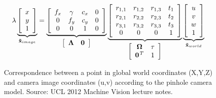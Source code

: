 \documentclass{ucl_thesis}
\begin{document}
\begin{figure}[h!]
\begin{equation}
\lambda
\underbrace{
	\left[\begin{array}{ccc}
	    x \\
	    y \\
	    1 \\
	\end{array} \right]
}_{
	{\bf \tilde{x}}_{image}
}
%
=
%
\underbrace{
	\left[\begin{array}{cccc}
			f_x & \gamma & c_x & 0 \\
			0   & f_y    & c_y & 0 \\
	 		0   & 0      & 1   & 0 \\
	\end{array} \right]
}_{
	\left[\begin{array}{cc}
		\bf{\Lambda} & \bf{0}
	\end{array} \right]
}
%
\underbrace{
	\left[\begin{array}{cccc}
	    r_{1,1} & r_{1,2} & r_{1,3} & t_1 \\
	    r_{2,1} & r_{2,2} & r_{2,3} & t_2 \\
	    r_{3,1} & r_{3,2} & r_{3,3} & t_3 \\
	    0       & 0       & 0       & 1 \\
	\end{array} \right]
}_{
	\left[\begin{array}{cc}
		\bf{\Omega}     & \bf{\tau} \\
		\bf{0}^{\it{T}} 	& 1		      \\
	\end{array} \right]
}
%
\underbrace{
	\left[\begin{array}{c}
	    u \\
	    v \\
	    w \\
	    1 \\
	\end{array} \right]
}_{
	{\bf \tilde{x}}_{world}
}
\end{equation}
\caption{Correspondence between a point in global world coordinates (X,Y,Z) and camera image coordinates (u,v) according to the pinhole camera model. Source: UCL 2012 Machine Vision lecture notes. }
\label{eq:pinhole}
\end{figure}
\end{document}
